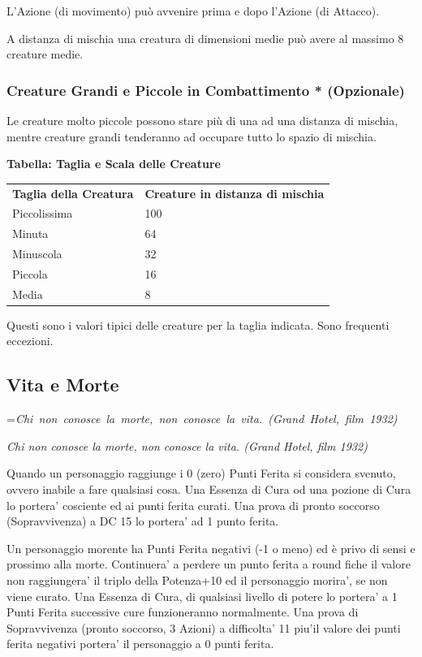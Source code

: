 \documentclass[a4paper,11pt,twoside,openany]{book}
\makeatletter
\newcommand{\mybox}[1]{%
	\setbox0=\hbox{#1}%
	\setlength{\@tempdima}{\dimexpr\wd0+13pt}%
	\begin{tcolorbox}[boxrule=0.5pt,arc=4pt, breakable,enhanced,
		left=6pt,right=6pt,top=6pt,bottom=6pt,boxsep=0pt,width=\@tempdima]
		#1
	\end{tcolorbox}
}
\makeatother
\begin{document}
L'Azione (di movimento) può avvenire prima e dopo l'Azione (di Attacco).

A distanza di mischia una creatura di dimensioni medie può avere al massimo 8 creature medie.


\subsubsection{Creature Grandi e Piccole in Combattimento {*} (Opzionale)}

\label{creature-grandi-e-piccole-in-combattimento-opzionale}

Le creature molto piccole possono stare più di una ad una distanza di mischia, mentre creature grandi tenderanno ad occupare tutto lo spazio di mischia.

\medskip

\textbf{Tabella: Taglia e Scala delle Creature}

\medskip
\begin{tabular}{ll}
	\toprule 
	\textbf{Taglia della Creatura} & \textbf{Creature in distanza di mischia}\tabularnewline
	Piccolissima & 100\tabularnewline
	Minuta & 64\tabularnewline
	Minuscola & 32\tabularnewline
	Piccola & 16\tabularnewline
	Media & 8\tabularnewline	
\end{tabular}

\smallskip
Questi sono i valori tipici delle creature per la taglia indicata.
Sono frequenti eccezioni.
\bigskip

\pagebreak

\subsection{Vita e Morte}

\label{vita-e-morte}
\mybox{\textit{Chi non conosce la morte, non conosce la vita. (Grand Hotel, film 1932)
}}\medskip

Quando un personaggio raggiunge i 0 (zero) Punti Ferita si considera svenuto, ovvero inabile a fare qualsiasi cosa. Una Essenza di Cura od una pozione di Cura lo portera’ cosciente ed ai punti ferita curati. Una prova di pronto soccorso (Sopravvivenza) a DC 15 lo portera’ ad 1 punto ferita.

Un personaggio morente ha Punti Ferita negativi (-1 o meno) ed è privo di sensi e prossimo alla morte. Continuera’ a perdere un punto ferita a round fiche il valore non raggiungera’ il triplo della Potenza+10 ed il personaggio morira’, se non viene curato.
Una Essenza di Cura, di qualsiasi livello di potere lo portera’ a 1 Punti Ferita successive cure funzioneranno normalmente.
Una prova di Sopravvivenza (pronto soccorso, 3 Azioni) a difficolta’ 11 piu’il valore dei punti ferita negativi portera’ il personaggio a 0 punti ferita.
\end{document}
